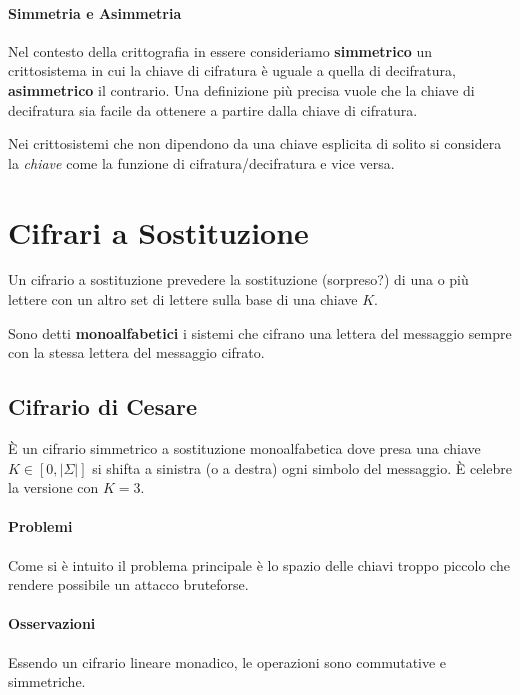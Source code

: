 \paragraph{Simmetria e Asimmetria}

Nel contesto della crittografia in essere consideriamo \textbf{simmetrico} un crittosistema in cui la chiave di cifratura \`e uguale a quella di decifratura, \textbf{asimmetrico} il contrario. Una definizione pi\`u precisa vuole che la chiave di decifratura sia facile da ottenere a partire dalla chiave di cifratura.

Nei crittosistemi che non dipendono da una chiave esplicita di solito si considera la \textit{chiave} come la funzione di cifratura/decifratura e vice versa.

\section{Cifrari a Sostituzione}

Un cifrario a sostituzione prevedere la sostituzione (sorpreso?) di una o pi\`u lettere con un altro set di lettere sulla base di una chiave $K$.

Sono detti \textbf{monoalfabetici} i sistemi che cifrano una lettera del messaggio sempre con la stessa lettera del messaggio cifrato.

\subsection{Cifrario di Cesare}

\`E un cifrario simmetrico a sostituzione monoalfabetica dove presa una chiave $K \in [0, |\Sigma|]$ si shifta a sinistra (o a destra) ogni simbolo del messaggio. \`E celebre la versione con $K = 3$.


\paragraph{Problemi}

Come si \`e intuito il problema principale \`e lo spazio delle chiavi troppo piccolo che rendere possibile un attacco bruteforse.

\paragraph{Osservazioni}

Essendo un cifrario lineare monadico, le operazioni sono commutative e simmetriche.

